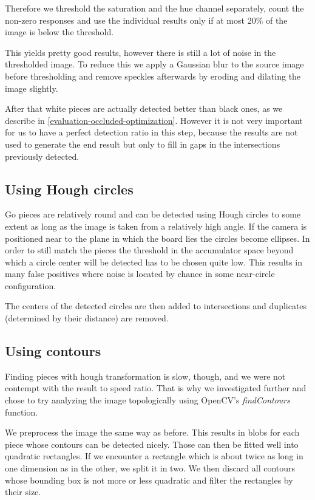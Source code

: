 	Therefore we threshold the saturation and the hue channel separately, count the non-zero responses and use the individual results only if at most 20\% of the image is below the threshold.

	This yields pretty good results, however there is still a lot of noise in the thresholded image. To reduce this we apply a Gaussian blur to the source image before thresholding and remove speckles afterwards by eroding and dilating the image slightly.

	After that white pieces are actually detected better than black ones, as we describe in \ref{evaluation-occluded-optimization}. However it is not very important for us to have a perfect detection ratio in this step, because the results are not used to generate the end result but only to fill in gaps in the intersections previously detected.

	\subsection{Using Hough circles}
	\label{detector-occluded-hough}
	Go pieces are relatively round and can be detected using Hough circles to some extent as long as the image is taken from a relatively high angle. If the camera is positioned near to the plane in which the board lies the circles become ellipses. In order to still match the pieces the threshold in the accumulator space beyond which a circle center will be detected has to be chosen quite low. This results in many false positives where noise is located by chance in some near-circle configuration.

	The centers of the detected circles are then added to intersections and duplicates (determined by their distance) are removed.

	\subsection{Using contours}
	\label{detector-occluded-contours}
	Finding pieces with hough transformation is slow, though, and we were not contempt with the result to speed ratio. That is why we investigated further and chose to try analyzing the image topologically using OpenCV's \emph{findContours} function.

	We preprocess the image the same way as before. This results in blobs for each piece whose contours can be detected nicely. Those can then be fitted well into quadratic rectangles. If we encounter a rectangle which is about twice as long in one dimension as in the other, we split it in two. We then discard all contours whose bounding box is not more or less quadratic and filter the rectangles by their size.

